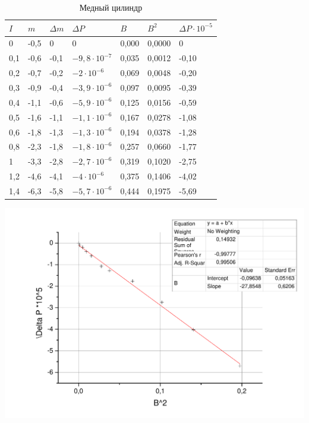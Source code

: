 \documentclass[a4paper,12pt]{article}
\begin{document}
	\begin{table}[h!]
		\centering
		\caption{Медный цилиндр}
		\label{my-label}
		\begin{tabular}{|l|l|l|l|l|l|l|}
			\hline
			$I$   & $m$    & $\Delta m$   & $\Delta P $      & $B$     & $B^2$ & $\Delta P\cdot10^{-5}$ \\ \hline
			0   & -0,5 & 0    & 0        & 0,000 & 0,0000              & 0                       \\ \hline
			0,1 & -0,6 & -0,1 & $-9,8\cdot10^{-7}$ & 0,035 & 0,0012              & -0,10                   \\ \hline
			0,2 & -0,7 & -0,2 & $-2\cdot10^{-6} $  & 0,069 & 0,0048              & -0,20                   \\ \hline
			0,3 & -0,9 & -0,4 & $-3,9\cdot10^{-6}$ & 0,097 & 0,0095              & -0,39                   \\ \hline
			0,4 & -1,1 & -0,6 & $-5,9\cdot10^{-6} $& 0,125 & 0,0156              & -0,59                   \\ \hline
			0,5 & -1,6 & -1,1 & $-1,1\cdot10^{-6} $& 0,167 & 0,0278              & -1,08                   \\ \hline
			0,6 & -1,8 & -1,3 & $-1,3\cdot10^{-6} $& 0,194 & 0,0378              & -1,28                   \\ \hline
			0,8 & -2,3 & -1,8 & $-1,8\cdot10^{-6} $& 0,257 & 0,0660              & -1,77                   \\ \hline
			1   & -3,3 & -2,8 & $-2,7\cdot10^{-6} $& 0,319 & 0,1020              & -2,75                   \\ \hline
			1,2 & -4,6 & -4,1 & $-4\cdot10^{-6} $& 0,375 & 0,1406              & -4,02                   \\ \hline
			1,4 & -6,3 & -5,8 & $-5,7\cdot10^{-6} $& 0,444 & 0,1975              & -5,69                   \\ \hline
		\end{tabular}
	\end{table}
	
	\includegraphics[width = 0.7\linewidth]{graph2}
	
\end{document}

